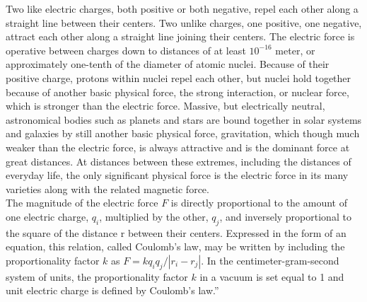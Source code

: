 \documentclass[11pt]{report}
\begin{document}
\begin{appendix}
 Two like electric charges, both positive or both negative,
 repel each other along a straight line between their centers.
 Two unlike charges, one positive, one negative, attract each
 other along a straight line joining their centers. The
 electric force is operative between charges down to distances
 of at least $10^{-16}$ meter, or approximately one-tenth of the
 diameter of atomic nuclei. Because of their positive charge,
 protons within nuclei repel each other, but nuclei hold
 together because of another basic physical force, the strong
 interaction, or nuclear force, which is stronger than the
 electric force. Massive, but electrically neutral,
 astronomical bodies such as planets and stars are bound
 together in solar systems and galaxies by still another basic
 physical force, gravitation, which though much weaker than
 the electric force, is always attractive and is the dominant
 force at great distances. At distances between these
 extremes, including the distances of everyday life, the only
 significant physical force is the electric force in its many
 varieties along with the related magnetic force.\\

 The magnitude of the electric force $F$ is directly
 proportional to the amount of one electric charge, $q_i$,
 multiplied by the other, $q_j$, and inversely proportional to
 the square of the distance r between their centers. Expressed
 in the form of an equation, this relation, called Coulomb's
 law, may be written by including the proportionality factor $k$
 as $F = kq_{i}q_{j}/|r_i - r_j|$. In the centimeter-gram-second system of
 units, the proportionality factor $k$ in a vacuum is set equal
 to 1 and unit electric charge is defined by Coulomb's law.''








\end{appendix}
\end{document}
